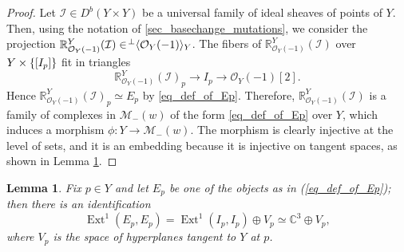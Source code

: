 \documentclass[11pt]{amsart}
\newtheorem{lemma}[thm]{Lemma}
\theoremstyle{definition}
\newcommand{\C}{\mathbb{C}}
\DeclareMathOperator{\Ext}{Ext}
\newcommand{\sO}{\mathcal{O}}
\newcommand{\sM}{\mathcal{M}}
\newcommand{\sE}{\mathcal{E}}
\DeclarePairedDelimiter{\set}{\lbrace}{\rbrace}
\DeclarePairedDelimiter{\pair}{\langle}{\rangle}
\newcommand{\sI}{\mathcal{I}}
\begin{document}
\begin{proof}
Let $\sI\in D^b(Y\times Y)$ be a universal family of ideal sheaves of points of $Y$. Then, using the notation of \ref{sec_basechange_mutations}, we consider the projection $\mathbb R_{\sO_Y(-1)}^Y(\sI) \in \!^\perp\pair{\sO_Y(-1)}_Y$. The fibers of $\mathbb R_{\sO_Y(-1)}^Y(\sI)$ over $Y\times \set{[I_p]}$ fit in triangles
\[ \mathbb R_{\sO_Y(-1)}^Y(\sI)_p \to I_p \to \sO_Y(-1)[2]. \]
Hence $\mathbb R_{\sO_Y(-1)}^Y(\sI)_p\simeq E_p$ by \eqref{eq_def_of_Ep}. Therefore, $\mathbb R_{\sO_Y(-1)}^Y(\sI)$ is a family of complexes in $\sM_-(w)$ of the form \eqref{eq_def_of_Ep} over $Y$, which induces a morphism $\phi\colon Y \to \sM_-(w)$. The morphism is clearly injective at the level of sets, and it is an embedding because it is injective on tangent spaces, as shown in Lemma \ref{lem_numerics}.
\end{proof}



\begin{lemma} \label{lem_numerics}
Fix $p\in Y$ and let $E_p$ be one of the objects as in (\ref{eq_def_of_Ep}); then there is an identification
 \begin{equation}\label{eq_decomposition_of_tangent_space}
     \Ext^1(E_p,E_p)= \Ext^1(I_p,I_p) \oplus V_p\simeq \C^3\oplus V_p,
\end{equation}
where $V_p$ is the space of hyperplanes tangent to $Y$ at $p$.
\end{lemma}
\end{document}
